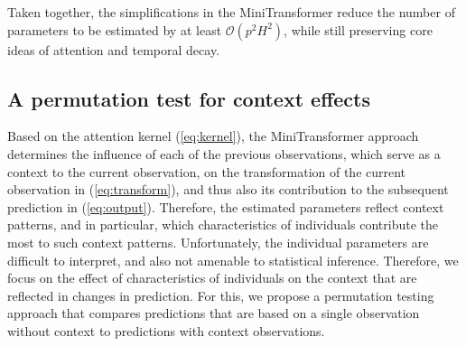 \documentclass[AMA,Times1COL]{WileyNJDv5} %
\begin{document}

Taken together, the simplifications in the MiniTransformer reduce the number of parameters to be estimated by at least $\mathcal{O}(p^2H^2)$, while still preserving core ideas of attention and temporal decay.

\subsection{A permutation test for context effects}\label{sec:statistical_testing}

Based on the attention kernel (\ref{eq:kernel}), the MiniTransformer approach determines the influence of each of the previous observations, which serve as a context to the current observation, on the transformation of the current observation in (\ref{eq:transform}), and thus also its contribution to the subsequent prediction in (\ref{eq:output}). Therefore, the estimated parameters reflect context patterns, and in particular, which characteristics of individuals contribute the most to such context patterns. Unfortunately, the individual parameters are difficult to interpret, and also not amenable to statistical inference. Therefore, we focus on the effect of characteristics of individuals on the context that are reflected in changes in prediction. For this, we propose
a permutation testing approach that compares predictions that are based on a single observation without context to predictions with context observations. 
\end{document}
